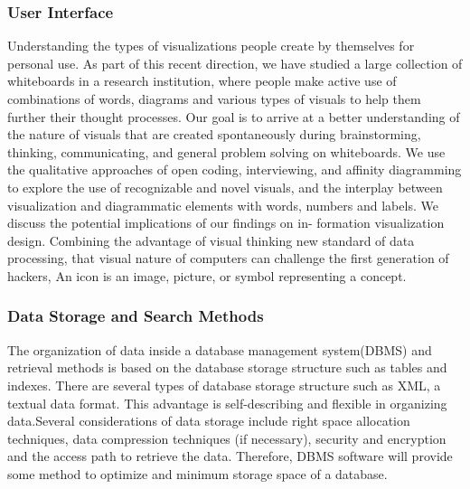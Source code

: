 \subsubsection*{User Interface}
Understanding the types of visualizations people create by themselves for personal use. As part of this recent direction, we have studied a large collection of whiteboards in a research institution, where people make active use of combinations of words, diagrams and various types of visuals to help them further their thought processes. Our goal is to arrive at a better understanding of the nature of visuals that are created spontaneously during brainstorming, thinking, communicating, and general problem solving on whiteboards.\cite{Blascheck2016} We use the qualitative approaches of open coding, interviewing, and affinity diagramming to explore the use of recognizable and novel visuals, and the interplay between visualization and diagrammatic elements with words, numbers and labels. We discuss the potential implications of our findings on in- formation visualization design. Combining the advantage of visual thinking new standard of data processing, that visual nature of computers can challenge the first generation of hackers, An icon is an image, picture, or symbol representing a concept.\cite{Szpunar2010}
	
	
\subsubsection*{Data Storage and Search Methods}
The organization of data inside a database management system(DBMS) and retrieval methods is based on the database storage structure such as tables and indexes. There are several types of database storage structure such as XML, a textual data format. This advantage is self-describing and flexible in organizing data.\cite{ISI:000253400700005}Several considerations of data storage include right space allocation techniques, data compression techniques (if necessary), security and encryption and the access path to retrieve the data. Therefore, DBMS software will provide some method to optimize and minimum storage space of a database.
	
